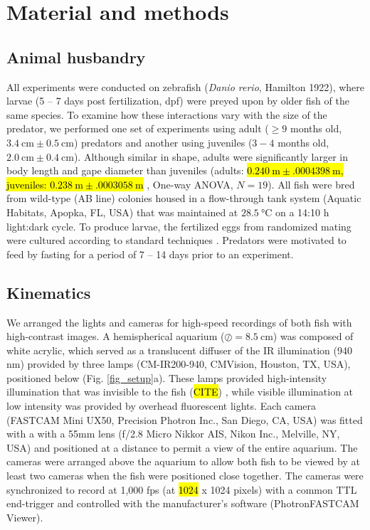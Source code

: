 \documentclass[]{rsos}%
\begin{document}
\section{Material and methods}

\subsection{Animal husbandry}
All experiments were conducted on zebrafish (\textit{Danio rerio}, Hamilton 1922), where larvae (5 -- 7 days post fertilization, dpf) were preyed upon by older fish of the same species. 
To examine how these interactions vary with the size of the predator, we performed one set of experiments using adult ($\geq 9$ months old, $\SI{3.4}{\cm} \pm \SI{0.5}{\cm}$) predators and another using juveniles ($3-4$ months old, $\SI{2.0}{\cm}  \pm  \SI{0.4}{\cm}$). 
Although similar in shape, adults were significantly larger in body length and gape diameter than juveniles (adults: \hl{$\SI{0.240}{\m} \pm \SI{.0004398}{\m}$, juveniles: $\SI{0.238}{\m} \pm \SI{.0003058}{\m}$}
, One-way ANOVA, $N = 19$).
All fish were bred from wild-type (AB line) colonies housed in a flow-through tank system (Aquatic Habitats, Apopka, FL, USA) that was maintained at $\SI{28.5}{\celsius}$ on a 14:10 h light:dark cycle. 
To produce larvae, the fertilized eggs from randomized mating were cultured according to standard techniques \cite{Westerfield:UXiBrEuA}.
Predators were motivated to feed by fasting for a period of 7 -- 14 days prior to an experiment.


\subsection{Kinematics}
We arranged the lights and cameras for high-speed recordings of both fish with high-contrast images. 
A hemispherical aquarium ($\oslash = \SI{8.5}{\cm}$) was composed of white acrylic, which served as a translucent diffuser of the IR illumination (940 nm) provided by three lamps (CM-IR200-940, CMVision, Houston, TX, USA), positioned below (Fig. \ref{fig_setup}a). 
These lamps provided high-intensity illumination that was invisible to the fish (\hl{CITE})
, while visible illumination at low intensity was provided by overhead fluorescent lights.
Each camera (FASTCAM Mini UX50, Precision Photron Inc., San Diego, CA, USA) was fitted with a with a 55mm lens (f/2.8 Micro Nikkor AIS, Nikon Inc., Melville, NY, USA) and positioned at a distance to permit a view of the entire aquarium. 
The cameras were arranged above the aquarium to allow both fish to be viewed by at least two cameras when the fish were positioned close together.
The cameras were synchronized to record at 1,000 fps (at \hl{1024}
 x 1024 pixels) with a common TTL end-trigger and controlled with the manufacturer's software (PhotronFASTCAM Viewer).
\end{document}
